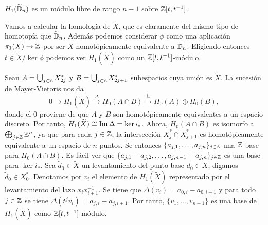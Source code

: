 \documentclass[TFG.tex]{subfiles}
\begin{document}
\begin{prop}\label{dimension}
$H_1(\widetilde{\mathbb{D}}_n)$ es un módulo libre de rango $n-1$ sobre $\mathbb{Z}[t,t^{-1}]$.
\end{prop}
\begin{dem}



Vamos a calcular la homología de $\widetilde{X}$, que es claramente del mismo tipo de homotopía que $\widetilde{\mathbb{D}}_n$. Además podemos considerar $\phi$ como una aplicación $\pi_1(X)\to\mathbb{Z}$ por ser $X$ homotópicamente equivalente a $\mathbb{D}_n$. Eligiendo entonces $t\in \widetilde{X}/\ker\phi$ podemos ver $H_1(\widetilde{X})$ como un $\mathbb{Z}[t,t^{-1}]$-módulo. 

Sean $A=\bigcup_{j\in\mathbb{Z}}X_{2j}^*$ y $B=\bigcup_{j\in\mathbb{Z}}X_{2j+1}^*$ subespacios cuya unión es $\widetilde{X}$. La sucesión de Mayer-Vietoris nos da
\[
0\to H_1(\widetilde{X})\overset{\Delta}{\to} H_0(A\cap B)\overset{i_*}{\to} H_0(A)\oplus H_0(B),
\]
donde el 0 proviene de que $A$ y $B$ son homotópicamente equivalentes a un espacio discreto. Por tanto, $H_1(\widetilde{X})\cong \operatorname{Im}\Delta=\ker i_*$. Ahora, $H_0(A\cap B)$ es isomorfo a $\bigoplus_{j\in\mathbb{Z}}\mathbb{Z}^n$, ya que para cada $j\in\mathbb{Z}$, la intersección $X_j^*\cap X_{j+1}^*$ es homotópicamente equivalente a un espacio de $n$ puntos. Se entonces $\{a_{j,1},\dots, a_{j,n}\}_{j\in\mathbb{Z}}$ una $\mathbb{Z}$-base para $H_0(A\cap B)$. Es fácil ver que $\{a_{j,1}-a_{j,2},\dots,a_{j,n-1}-a_{j,n}\}_{j\in\mathbb{Z}}$ es una base para $\ker i_*$. Sea $\tilde{d}_0\in\widetilde{X}$ un levantamiento del punto base $d_0\in X$, digamos $\tilde{d}_0\in X_0^*$. Denotamos por $v_i$ el elemento de $H_1(\widetilde{X})$ representado por el levantamiento del lazo $x_ix_{i+1}^{-1}$. Se tiene que $\Delta (v_i)=a_{0,i}-a_{0,i+1}$ \cite{thesis} y para todo $j\in\mathbb{Z}$ se tiene $\Delta(t^j v_i)=a_{j,i}-a_{j,i+1}$. Por tanto, $\{v_1,\dots, v_{n-1}\}$ es una base de $H_1(\widetilde{X})$ como $\mathbb{Z}[t,t^{-1}]$-módulo. \QED
\end{dem}

\end{document}
